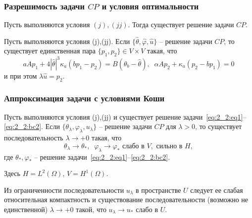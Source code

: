\begin{frame}
    \frametitle{Разрешимость задачи $CP$ и условия оптимальности}

    \begin{theorem}[2.3]
        \label{th:2_2:1}
        Пусть выполняются условия $(j), (jj)$.
        Тогда существует решение задачи $CP$.
    \end{theorem}
    \begin{theorem}[2.4]
        \label{th:2_2:2}
        Пусть выполняются условия (j),(jj).
        Если $\{\hat{\theta}, \hat{\varphi}, \hat{u}\}$ -- решение задачи $CP$,
        то существует единственная пара $\{p_1, p_2 \} \in V\times V$ такая, что
        \begin{equation}
            \label{eq:2_2:as}
            aAp_1 +4|\hat{\theta}|^3 \kappa_a(bp_1 - p_2) = B(\theta_b - \hat{\theta}), \;\;
            \alpha A p_2 + \kappa_a (p_2 - b p_1)=0
        \end{equation}
        и при этом $\lambda\hat{u} = p_2$.
    \end{theorem}
\end{frame}


\begin{frame}
    \frametitle{Аппроксимация задачи с условиями Коши}
    \begin{theorem}[2.5]
        \label{th:2_2:3}
        Пусть выполняются условия (j),(jj) и существует решение
        задачи~\eqref{eq:2_2:eq1}--\eqref{eq:2_2:bc2}.
        Если $\{\theta_\lambda,\varphi_\lambda,u_\lambda\}$ -- решение
        задачи $CP$ для $\lambda>0$, то существует последовательность $\lambda\to +0$
        такая, что
        \[
            \theta_\lambda\rightarrow\theta_*, \;\; \varphi_\lambda\rightarrow\varphi_*
            \text{ слабо в }V,\text{ сильно в }H,
        \]
        где $\theta_*,\varphi_*$ -- решение задачи~\eqref{eq:2_2:eq1}--\eqref{eq:2_2:bc2}.
    \end{theorem}
    Здесь $H = L^2(\Omega)$, $V = H^1(\Omega)$.

    \vspace{10mm}
    Из ограниченности последовательности $u_\lambda$
    в пространстве $U$ следует
    ее слабая относительная компактность и существование последовательности
    (возможно не единственной) $\lambda\to+0$ такой, что
    $u_\lambda \rightarrow u_*$ слабо в $U$.

\end{frame}

